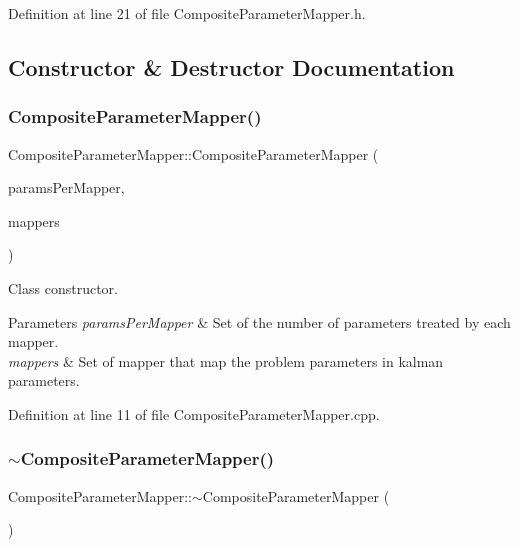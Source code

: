 Definition at line 21 of file Composite\+Parameter\+Mapper.\+h.



\subsection{Constructor \& Destructor Documentation}
\mbox{\label{classCompositeParameterMapper_a449747544babe7240562d53944a4742c}} 
\subsubsection{\texorpdfstring{Composite\+Parameter\+Mapper()}{CompositeParameterMapper()}}
{\footnotesize\ttfamily Composite\+Parameter\+Mapper\+::\+Composite\+Parameter\+Mapper (\begin{DoxyParamCaption}\item[{vector$<$ int $>$}]{params\+Per\+Mapper,  }\item[{vector$<$ \mbox{\hyperlink{classAbstractParameterMapper}{Abstract\+Parameter\+Mapper}} $\ast$$>$}]{mappers }\end{DoxyParamCaption})}

Class constructor. 
\begin{DoxyParams}{Parameters}
{\em params\+Per\+Mapper} & Set of the number of parameters treated by each mapper. \\
\hline
{\em mappers} & Set of mapper that map the problem parameters in kalman parameters. \\
\hline
\end{DoxyParams}


Definition at line 11 of file Composite\+Parameter\+Mapper.\+cpp.

\mbox{\label{classCompositeParameterMapper_a7905cc0fa03c261cb50d8443bb486764}} 
\subsubsection{\texorpdfstring{$\sim$\+Composite\+Parameter\+Mapper()}{~CompositeParameterMapper()}}
{\footnotesize\ttfamily Composite\+Parameter\+Mapper\+::$\sim$\+Composite\+Parameter\+Mapper (\begin{DoxyParamCaption}{ }\end{DoxyParamCaption})\hspace{0.3cm}{\ttfamily [virtual]}}

